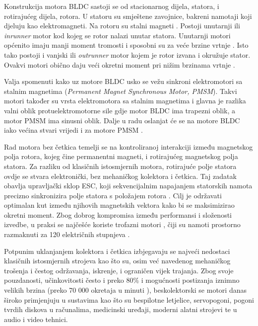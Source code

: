 \documentclass[diplomskirad]{fer}
\begin{document}
Konstrukcija motora BLDC sastoji se od stacionarnog dijela, statora, i
rotirajućeg dijela, rotora. U statoru su smještene zavojnice, bakreni namotaji
koji djeluju kao elektromagneti. Na rotoru su stalni magneti
\cite{elektromotor-beskolektorski}. Postoji unutarnji ili \textit{ inrunner }
motor kod kojeg se rotor nalazi unutar statora. Unutarnji motori općenito imaju
manji moment tromosti i sposobni su za veće brzine vrtnje \cite{cite:bldc}.
Isto tako postoji i vanjski ili \textit{ outrunner } motor kojem je rotor
izvana i okružuje stator. Ovakvi motori obično daju veći okretni moment pri
nižim brzinama vrtnje \cite{cite:bldc}.


Valja spomenuti kako uz motore BLDC usko se vežu sinkroni elektromotori sa
stalnim magnetima (\textit{Permanent Magnet Synchronous Motor, PMSM}). Takvi
motori također su vrsta elektromotora sa stalnim magnetima i glavna je razlika
valni oblik protuelektromotorne sile gdje motor BLDC ima trapezni oblik, a
motor PMSM ima sinusni oblik. Dalje u radu oslanjat će se na motore BLDC iako
većina stvari vrijedi i za motore PMSM
\cite{elektromotor-sa-stalnim-magnetima}.

Rad motora bez četkica temelji se na kontroliranoj interakciji između
magnetskog polja rotora, kojeg čine permanentni magneti, i rotirajućeg
magnetskog polja statora. Za razliku od klasičnih istosmjernih motora,
rotirajuće polje statora ovdje se stvara elektronički, bez mehaničkog kolektora
i četkica. Taj zadatak obavlja upravljački sklop ESC, koji sekvencijalnim
napajanjem statorskih namota precizno sinkronizira polje statora s položajem
rotora \cite{cite:disertacija}. Cilj je održavati optimalan kut između njihovih
magnetskih vektora kako bi se maksimizirao okretni moment. Zbog dobrog
kompromisa između performansi i složenosti izvedbe, u praksi se najčešće
koriste trofazni motori \cite{cite:trofazni}, čiji su namoti prostorno
razmaknuti za 120 električnih stupnjeva \cite{MicrochipAN885}.

Potpunim uklanjanjem kolektora i četkica izbjegavaju se najveći nedostaci
klasičnih istosmjernih strojeva kao što su, osim već navedenog mehaničkog
trošenja i čestog održavanja, iskrenje, i ograničen vijek trajanja. Zbog svoje
pouzdanosti, učinkovitosti često i preko 80\% \cite{motor-ucinkovitost} i
mogućnosti postizanja iznimno velikih brzina (preko 70 000 okretaja u minuti
\cite{motor-rpm}), beskolektorski se motori danas široko primjenjuju u
sustavima kao što su bespilotne letjelice, servopogoni, pogoni tvrdih diskova u
računalima, medicinski uređaji, moderni alatni strojevi te u audio i video
tehnici.
\end{document}
